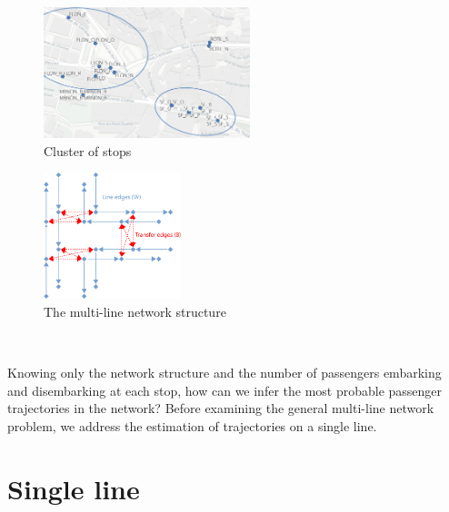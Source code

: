 \documentclass{llncs}
\begin{document}
\noindent \begin{minipage}[c]{0.5\textwidth}
   \begin{figure}[H]
      \centering
      \includegraphics[width=6cm]{img/stop_area_c.png}
      \caption{Cluster of stops} 
      \label{fig:map-lausanne}
   \end{figure}
\end{minipage}%
\begin{minipage}[c]{0.5\textwidth}
   \begin{figure}[H]
      \centering
      \includegraphics[width=4cm]{img/edge_type3.png}
      \caption{The multi-line network structure} 
      \label{fig:network-lausanne}
   \end{figure}
\end{minipage}

$\mbox{}$

Knowing only the network structure and the number of passengers embarking and disembarking at each stop, how can we infer the most probable passenger trajectories in the network? Before examining the general multi-line network problem,  we address the estimation of trajectories on a single line.

%
\section{Single line}
%
\end{document}
